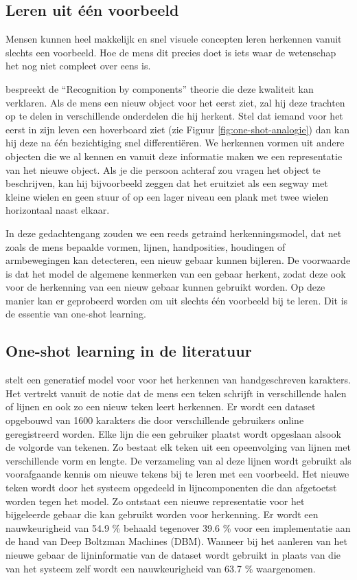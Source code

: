 \subsection{Leren uit \'e\'en voorbeeld}
Mensen kunnen heel makkelijk en snel visuele concepten leren herkennen vanuit slechts een voorbeeld. Hoe de mens dit precies doet is iets waar de wetenschap het nog niet compleet over eens is.

\npar \cite{recognition-components} bespreekt de ``Recognition by components'' theorie  die deze kwaliteit kan verklaren. Als de mens een nieuw object voor het eerst ziet, zal hij deze trachten op te delen in verschillende onderdelen die hij herkent. Stel dat iemand voor het eerst in zijn leven een hoverboard ziet (zie Figuur \ref{fig:one-shot-analogie}) dan kan hij deze na \'e\'en bezichtiging snel differenti\"eren. We herkennen vormen uit andere objecten die we al kennen en vanuit deze informatie maken we een representatie van het nieuwe object. Als je die persoon achteraf zou vragen het object te beschrijven, kan hij bijvoorbeeld zeggen dat het eruitziet als een segway met kleine wielen en geen stuur of op een lager niveau een plank met twee wielen horizontaal naast elkaar.

\npar In deze gedachtengang zouden we een reeds getraind herkenningsmodel, dat net zoals de mens bepaalde vormen, lijnen, handposities, houdingen of armbewegingen kan detecteren, een nieuw gebaar kunnen bijleren. De voorwaarde is dat het model de algemene kenmerken van een gebaar herkent, zodat deze ook voor de herkenning van een nieuw gebaar kunnen gebruikt worden. Op deze manier kan er geprobeerd worden om uit slechts \'e\'en voorbeeld bij te leren. Dit is de essentie van one-shot learning. 

\subsection{One-shot learning in de literatuur}
\npar \cite{oneshot-vis-concepts} stelt een generatief model voor voor het herkennen van handgeschreven karakters. Het vertrekt vanuit de notie dat de mens een teken schrijft in verschillende halen of lijnen en ook zo een nieuw teken leert herkennen. Er wordt een dataset opgebouwd van 1600 karakters die door verschillende gebruikers online geregistreerd worden. Elke lijn die een gebruiker plaatst wordt opgeslaan alsook de volgorde van tekenen. Zo bestaat elk teken uit een opeenvolging van lijnen met verschillende vorm en lengte. De verzameling van al deze lijnen wordt gebruikt als voorafgaande kennis om nieuwe tekens bij te leren met een voorbeeld. Het nieuwe teken wordt door het systeem opgedeeld in lijncomponenten die dan afgetoetst worden tegen het model. Zo ontstaat een nieuwe representatie voor het bijgeleerde gebaar die kan gebruikt worden voor herkenning. Er wordt een nauwkeurigheid van 54.9 \% behaald tegenover 39.6 \% voor een implementatie aan de hand van Deep Boltzman Machines (DBM). Wanneer bij het aanleren van het nieuwe gebaar de lijninformatie van de dataset wordt gebruikt in plaats van die van het systeem zelf wordt een nauwkeurigheid van 63.7 \% waargenomen.

